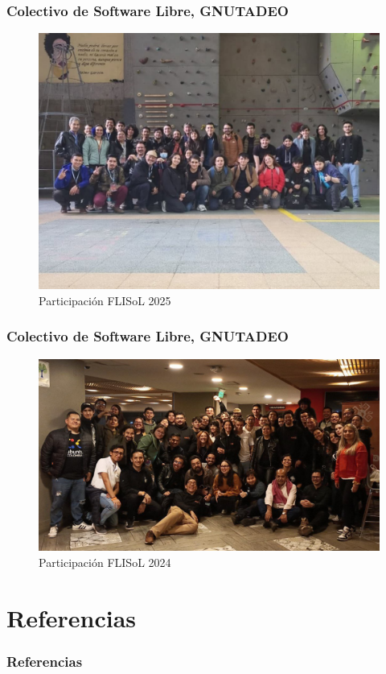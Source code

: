 \documentclass[17pt, t, lualatex]{beamer}
\begin{document}
\begin{frame}
  \frametitle{Colectivo de Software Libre, GNUTADEO}
  \begin{figure}
    \centering
    \includegraphics[height=0.85\textheight]{img/FLISOL2025.jpg}
    \caption{Participación FLISoL 2025}
  \end{figure}
\end{frame}

\begin{frame}
  \frametitle{Colectivo de Software Libre, GNUTADEO}
  \begin{figure}
    \centering
    \includegraphics[height=0.85\textheight]{img/FLISOL2024.jpg}
    \caption{Participación FLISoL 2024}
  \end{figure}
\end{frame}




\section{Referencias}
\begin{frame}
  \frametitle{Referencias}
  \printbibliography

\end{frame}

\insertendpage
\end{document}
